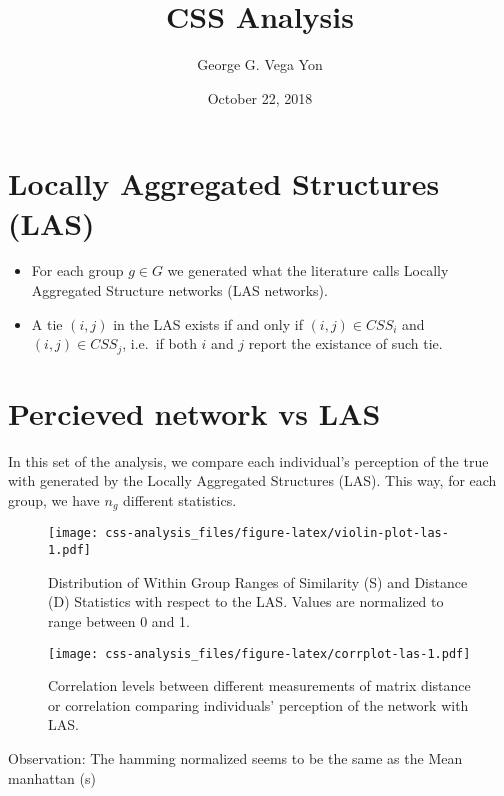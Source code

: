 \documentclass[
]{article}
\title{CSS Analysis}
\author{George G. Vega Yon}
\date{October 22, 2018}
\begin{document}
\maketitle

\renewcommand{\familydefault}{\sfdefault}

\hypertarget{locally-aggregated-structures-las}{%
\section{Locally Aggregated Structures
(LAS)}\label{locally-aggregated-structures-las}}

\begin{itemize}
\item
  For each group \(g \in G\) we generated what the literature calls
  Locally Aggregated Structure networks (LAS networks).
\item
  A tie \((i,j)\) in the LAS exists if and only if \((i,j) \in CSS_i\)
  and \((i,j) \in CSS_j\), i.e.~if both \(i\) and \(j\) report the
  existance of such tie.
\end{itemize}

\hypertarget{percieved-network-vs-las}{%
\section{Percieved network vs LAS}\label{percieved-network-vs-las}}

In this set of the analysis, we compare each individual's perception of
the true with generated by the Locally Aggregated Structures (LAS). This
way, for each group, we have \(n_g\) different statistics.

\begin{figure}
\centering
\texttt{[image: css-analysis\_files/figure-latex/violin-plot-las-1.pdf]}
\caption{Distribution of Within Group Ranges of Similarity (S) and
Distance (D) Statistics with respect to the LAS. Values are normalized
to range between 0 and 1.}
\end{figure}

\begin{figure}
\centering
\texttt{[image: css-analysis\_files/figure-latex/corrplot-las-1.pdf]}
\caption{Correlation levels between different measurements of matrix
distance or correlation comparing individuals' perception of the network
with LAS.}
\end{figure}

Observation: The hamming normalized seems to be the same as the Mean
manhattan (s)
\end{document}
